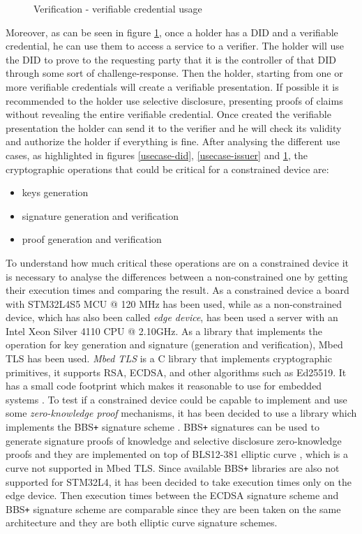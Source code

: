 \begin{figure}[!h]
    \centering
    
    \caption{Verification - verifiable credential usage}
    \label{usecase-verifier}
\end{figure}

Moreover, as can be seen in figure \ref{usecase-verifier}, once a holder has a DID and a verifiable credential, he can use them to access a service to a verifier. The holder will use the DID to prove to the requesting party that it is the controller of that DID through some sort of challenge-response. Then the holder, starting from one or more verifiable credentials will create a verifiable presentation. If possible it is recommended to the holder use selective disclosure, presenting proofs of claims without revealing the entire verifiable credential. Once created the verifiable presentation the holder can send it to the verifier and he will check its validity and authorize the holder if everything is fine.  
After analysing the different use cases, as highlighted in figures \ref{usecase-did}, \ref{usecase-issuer} and \ref{usecase-verifier}, the cryptographic operations that could be  critical for a constrained device are:
\begin{itemize}
    \item keys generation
    \item signature generation and verification
    \item proof generation and verification
\end{itemize}

To understand how much critical these operations are on a constrained device it is necessary to analyse the differences between a non-constrained one by getting their execution times and comparing the result. 
As a constrained device a board with STM32L4S5 MCU @ 120 MHz has been used, while as a non-constrained device, which has also been called \textit{edge device}, has been used a server with an Intel Xeon Silver 4110 CPU @ 2.10GHz. As a library that implements the operation for key generation and signature (generation and verification), Mbed TLS has been used. \textit{Mbed TLS} is a C library that implements cryptographic primitives, it supports RSA, ECDSA, and other algorithms such as Ed25519. It has a small code footprint which makes it reasonable to use for embedded systems \cite{mbed-tls}. To test if a constrained device could be capable to implement and use some \textit{zero-knowledge proof} mechanisms, it has been decided to use a library which implements the BBS\texttt{+} signature scheme \cite{bbsplus}. BBS\texttt{+} signatures can be used to generate signature proofs of knowledge and selective disclosure zero-knowledge proofs \cite{bbs-rust} and they are implemented on top of BLS12-381 elliptic curve \cite{bls-curve}, which is a curve not supported in Mbed TLS. Since available BBS\texttt{+} libraries are also not supported for STM32L4, it has been decided to take execution times only on the edge device. Then execution times between the ECDSA signature scheme and BBS\texttt{+} signature scheme are comparable since they are been taken on the same architecture and they are both elliptic curve signature schemes.

